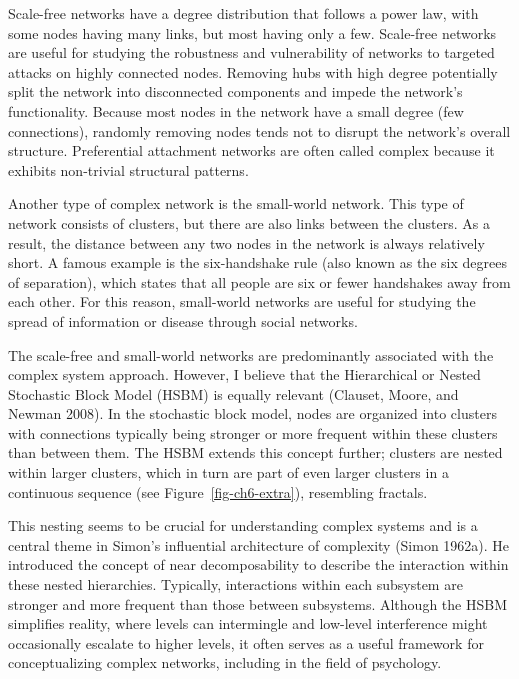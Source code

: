 \documentclass[
  a4paper,
  DIV=11,
  numbers=noendperiod,
  oneside]{scrreprt}
\begin{document}
Scale-free networks have a degree distribution that follows a power law,
with some nodes having many links, but most having only a few.
Scale-free networks are useful for studying the robustness and
vulnerability of networks to targeted attacks on highly connected nodes.
Removing hubs with high degree potentially split the network into
disconnected components and impede the network's functionality. Because
most nodes in the network have a small degree (few connections),
randomly removing nodes tends not to disrupt the network's overall
structure. Preferential attachment networks are often called complex
because it exhibits non-trivial structural patterns.

Another type of complex network is the small-world network. This type of
network consists of clusters, but there are also links between the
clusters. As a result, the distance between any two nodes in the network
is always relatively short. A famous example is the six-handshake rule
(also known as the six degrees of separation), which states that all
people are six or fewer handshakes away from each other. For this
reason, small-world networks are useful for studying the spread of
information or disease through social networks.

The scale-free and small-world networks are predominantly associated
with the complex system approach. However, I believe that the
Hierarchical or Nested Stochastic Block Model (HSBM) is equally relevant
(Clauset, Moore, and Newman 2008). In the stochastic block model, nodes
are organized into clusters with connections typically being stronger or
more frequent within these clusters than between them. The HSBM extends
this concept further; clusters are nested within larger clusters, which
in turn are part of even larger clusters in a continuous sequence (see
Figure~\ref{fig-ch6-extra}), resembling fractals.

This nesting seems to be crucial for understanding complex systems and
is a central theme in Simon's influential architecture of complexity
(Simon 1962a). He introduced the concept of near decomposability to
describe the interaction within these nested hierarchies. Typically,
interactions within each subsystem are stronger and more frequent than
those between subsystems. Although the HSBM simplifies reality, where
levels can intermingle and low-level interference might occasionally
escalate to higher levels, it often serves as a useful framework for
conceptualizing complex networks, including in the field of psychology.
\end{document}
